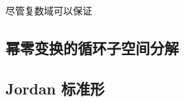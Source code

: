 

\begin{issues}
\issueDraft
\end{issues}

尽管复数域可以保证
\subsection{幂零变换的循环子空间分解}
\subsection{Jordan 标准形}